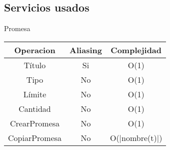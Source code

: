 \subsection{Servicios usados}


{\LARGE Promesa} \\

\begin{tabular}[c]{|c|c|c|}
	
	\hline
		Operacion & Aliasing & Complejidad \\
		\hline
		T\'itulo & Si &  O(1)\\
		\hline
		Tipo & No & O(1)\\
		\hline
		L\'imite & No & O(1)\\
		\hline
		Cantidad& No & O(1)\\
		\hline
		CrearPromesa & No & O(1)\\
		\hline
		CopiarPromesa & No & O(|nombre(t)|)\\
		\hline
	\end{tabular}\\\\
\newpage